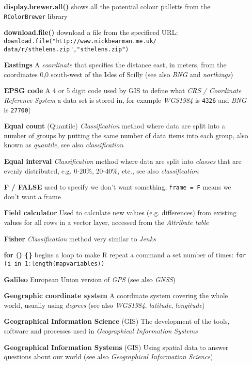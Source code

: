 \documentclass[a4paper,10pt]{article}
\begin{document}
\begin{multicols}{2}
\textbf{display.brewer.all()} shows all the potential colour palletts from the \texttt{RColorBrewer} library

\textbf{download.file()} download a file from the specificed URL: \texttt{download.file("http://www.nickbearman.me.uk/
data/r/sthelens.zip","sthelens.zip")}

\textbf{Eastings} A \textit{coordinate} that specifies the distance east, in meters, from the coordinates 0,0 south-west of the Isles of Scilly (see also \textit{BNG} and \textit{northings})

\textbf{EPSG code} A 4 or 5 digit code used by GIS to define what \textit{CRS / Coordinate Reference System} a data set is stored in, for example \textit{WGS1984} is \texttt{4326} and \textit{BNG} is \texttt{27700})

\textbf{Equal count} (Quantile) \textit{Classification} method where data are split into a number of groups by putting the same number of data items into each group, also known as \textit{quantile}, see also \textit{classification}

\textbf{Equal interval} \textit{Classification} method where data are split into \textit{classes} that are evenly distributed, e.g. 0-20\%, 20-40\%, etc., see also \textit{classification} 

\textbf{F / FALSE} used to specify we don't want something, \texttt{frame = F} means we don't want a frame

\textbf{Field calculator} Used to calculate new values (e.g. differences) from existing values for all rows in a vector layer, accessed from the \textit{Attribute table} 

\textbf{Fisher} \textit{Classification} method very similar to \textit{Jenks} 

\textbf{for () \{\}} begins a loop to make R repeat a command a set number of times: \texttt {for (i in 1:length(mapvariables))}

\textbf{Galileo} European Union version of \textit{GPS} (see also \textit{GNSS})

\textbf{Geographic coordinate system} A coordinate system covering the whole world, usually using \textit{degrees} (see also \textit{WGS1984}, \textit{latitude}, \textit{longitude})

\textbf{Geographical Information Science} (GIS) The development of the tools, software and processes used in \textit{Geographical Information Systems} 

\textbf{Geographical Information Systems} (GIS) Using spatial data to answer questions about our world (see also \textit{Geographical Information Science})


\end{multicols}
\end{document}
